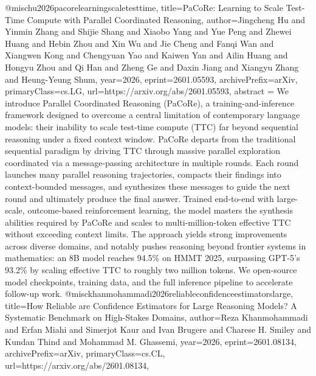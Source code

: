 {}@misc{hu2026pacorelearningscaletesttime,
      title={PaCoRe: Learning to Scale Test-Time Compute with Parallel Coordinated Reasoning}, 
      author={Jingcheng Hu and Yinmin Zhang and Shijie Shang and Xiaobo Yang and Yue Peng and Zhewei Huang and Hebin Zhou and Xin Wu and Jie Cheng and Fanqi Wan and Xiangwen Kong and Chengyuan Yao and Kaiwen Yan and Ailin Huang and Hongyu Zhou and Qi Han and Zheng Ge and Daxin Jiang and Xiangyu Zhang and Heung-Yeung Shum},
      year={2026},
      eprint={2601.05593},
      archivePrefix={arXiv},
      primaryClass={cs.LG},
      url={https://arxiv.org/abs/2601.05593},
      abstract = {We introduce Parallel Coordinated Reasoning (PaCoRe), a training-and-inference framework designed to overcome a central limitation of contemporary language models: their inability to scale test-time compute (TTC) far beyond sequential reasoning under a fixed context window. PaCoRe departs from the traditional sequential paradigm by driving TTC through massive parallel exploration coordinated via a message-passing architecture in multiple rounds. Each round launches many parallel reasoning trajectories, compacts their findings into context-bounded messages, and synthesizes these messages to guide the next round and ultimately produce the final answer. Trained end-to-end with large-scale, outcome-based reinforcement learning, the model masters the synthesis abilities required by PaCoRe and scales to multi-million-token effective TTC without exceeding context limits. The approach yields strong improvements across diverse domains, and notably pushes reasoning beyond frontier systems in mathematics: an 8B model reaches 94.5\% on HMMT 2025, surpassing GPT-5's 93.2\% by scaling effective TTC to roughly two million tokens. We open-source model checkpoints, training data, and the full inference pipeline to accelerate follow-up work.}
}@misc{khanmohammadi2026reliableconfidenceestimatorslarge,
      title={How Reliable are Confidence Estimators for Large Reasoning Models? A Systematic Benchmark on High-Stakes Domains}, 
      author={Reza Khanmohammadi and Erfan Miahi and Simerjot Kaur and Ivan Brugere and Charese H. Smiley and Kundan Thind and Mohammad M. Ghassemi},
      year={2026},
      eprint={2601.08134},
      archivePrefix={arXiv},
      primaryClass={cs.CL},
      url={https://arxiv.org/abs/2601.08134},
}

